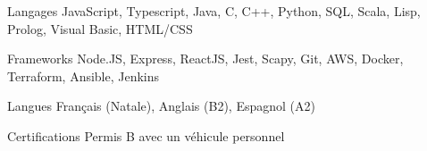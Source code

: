 
\begin{cvskills}
  \cvskill
    {Langages} %
    {JavaScript, Typescript, Java, C, C++, Python, SQL, Scala, Lisp, Prolog, Visual Basic, HTML/CSS} %

  \cvskill
    {Frameworks} %
    {Node.JS, Express, ReactJS, Jest, Scapy, Git, AWS, Docker, Terraform, Ansible, Jenkins} %
    
  \cvskill
    {Langues} %
    {Français (Natale), Anglais (B2), Espagnol (A2)} %
    
  \cvskill
    {Certifications} %
    {Permis B avec un véhicule personnel} %
\end{cvskills}
